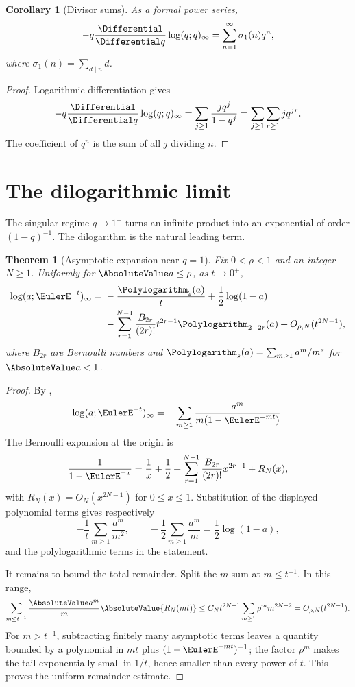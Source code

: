 \documentclass[11pt,a4paper,oneside,openany]{book}
\newtheorem{theorem}{Theorem}[chapter]
\newtheorem{corollary}[corollary]{Corollary}
\theoremstyle{definition}
\theoremstyle{remark}
\begin{document}
\begin{corollary}[Divisor sums]\label{cor:divisor-sum}
As a formal power series,
\[
 -q\frac{\Differential}{\Differential q}\log(q;q)_\infty
 =\sum_{n=1}^{\infty}\sigma_1(n)q^n,
\]
where $\sigma_1(n)=\sum_{d\mid n}d$.
\end{corollary}

\begin{proof}
Logarithmic differentiation gives
\[
 -q\frac{\Differential}{\Differential q}\log(q;q)_\infty
 =\sum_{j\ge1}\frac{j q^j}{1-q^j}
 =\sum_{j\ge1}\sum_{r\ge1}j q^{jr}.
\]
The coefficient of $q^n$ is the sum of all $j$ dividing $n$.
\end{proof}

\section{The dilogarithmic limit}

The singular regime $q\to1^-$ turns an infinite product into an exponential of order $(1-q)^{-1}$.  The dilogarithm is the natural leading term.

\begin{theorem}[Asymptotic expansion near $q=1$]\label{thm:poch-dilog}
Fix $0<\rho<1$ and an integer $N\ge1$.  Uniformly for $\AbsoluteValue a\le\rho$, as $t\to0^+$,
\[
\begin{aligned}
 \log(a;\EulerE^{-t})_\infty
 ={}&-\frac{\Polylogarithm_2(a)}{t}+\frac12\log(1-a)\\
 &-\sum_{r=1}^{N-1}\frac{B_{2r}}{(2r)!}
 t^{2r-1}\Polylogarithm_{2-2r}(a)+O_{\rho,N}(t^{2N-1}),
\end{aligned}
\]
where $B_{2r}$ are Bernoulli numbers and
\(
 \Polylogarithm_s(a)=\sum_{m\ge1}a^m/m^s
\)
for $\AbsoluteValue a<1$.
\end{theorem}

\begin{proof}
By ,
\[
 \log(a;\EulerE^{-t})_\infty
 =-\sum_{m\ge1}\frac{a^m}{m(1-\EulerE^{-mt})}.
\]
The Bernoulli expansion at the origin is
\[
 \frac1{1-\EulerE^{-x}}
 =\frac1x+\frac12+\sum_{r=1}^{N-1}
 \frac{B_{2r}}{(2r)!}x^{2r-1}+R_N(x),
\]
with $R_N(x)=O_N(x^{2N-1})$ for $0\le x\le1$.  Substitution of the displayed polynomial terms gives respectively
\[
 -\frac1t\sum_{m\ge1}\frac{a^m}{m^2},
 \qquad
 -\frac12\sum_{m\ge1}\frac{a^m}{m}=\frac12\log(1-a),
\]
and the polylogarithmic terms in the statement.

It remains to bound the total remainder.  Split the $m$-sum at $m\le t^{-1}$.  In this range,
\[
 \sum_{m\le t^{-1}}\frac{\AbsoluteValue a^m}{m}\AbsoluteValue{R_N(mt)}
 \le C_Nt^{2N-1}\sum_{m\ge1}\rho^m m^{2N-2}
 =O_{\rho,N}(t^{2N-1}).
\]
For $m>t^{-1}$, subtracting finitely many asymptotic terms leaves a quantity bounded by a polynomial in $mt$ plus $(1-\EulerE^{-mt})^{-1}$; the factor $\rho^m$ makes the tail exponentially small in $1/t$, hence smaller than every power of $t$.  This proves the uniform remainder estimate.
\end{proof}
\end{document}
